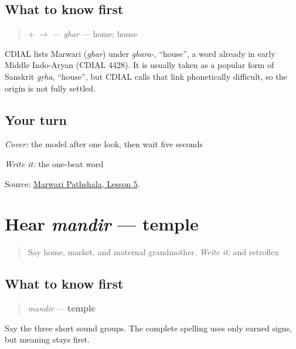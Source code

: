 \subsection*{What to know first}
\begin{quote}
\textbf{} + \textbf{} $\to$ \textbf{} — \emph{ghar} — home; house
\end{quote}

\begin{cousinweb}
CDIAL lists Marwari \textbf{} (\emph{ghar}) under \emph{ghara-}, \textquotedblleft{}house\textquotedblright{}, a word already in early Middle Indo-Aryan (CDIAL 4428). It is usually taken as a popular form of Sanskrit \emph{gṛha}, \textquotedblleft{}house\textquotedblright{}, but CDIAL calls that link phonetically difficult, so the origin is not fully settled.
\end{cousinweb}

\subsection*{Your turn}
\emph{Cover:} the model after one look, then wait five seconds

\emph{Write it:} the one-beat word

\begin{tcolorbox}[breakable,colback=teal!4,colframe=teal!35!black,title={Before you move on}]
Source: \href{https://www.marwaripathshala.com/marwari-lesson-5-english}{Marwari Pathshala, Lesson 5}.
\end{tcolorbox}
\section[mandir]{Hear \emph{mandir} — temple}

\label{lesson:MW-C10-hear-mandir}



\begin{quote}
Say home, market, and maternal grandmother. \emph{Write it:} \textbf{} and retroflex \textbf{}
\end{quote}

\subsection*{What to know first}
\begin{quote}
\emph{mandir} — \textbf{temple}
\end{quote}

Say the three short sound groups. The complete spelling uses only earned signs, but meaning stays first.

